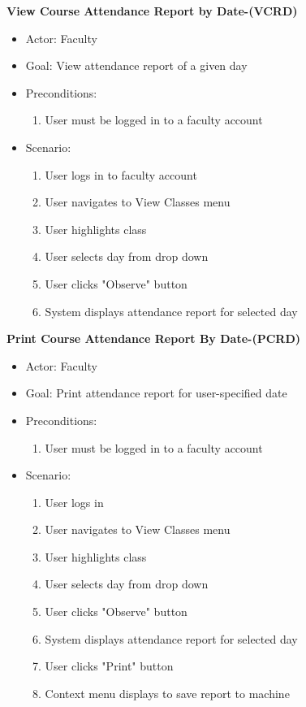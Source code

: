 \documentclass[letterpaper,12pt,oneside,listof=totoc]{scrreprt}
\begin{document}
\hfill \break
\textbf{View Course Attendance Report by Date-(VCRD)}
\begin{itemize}
    \item Actor: Faculty
    \item Goal: View attendance report of a given day
    \item Preconditions:
    \begin{enumerate}
        \item User must be logged in to a faculty account
    \end{enumerate}
    \item Scenario:
    \begin{enumerate}
        \item User logs in to faculty account
        \item User navigates to View Classes menu
        \item User highlights class
        \item User selects day from drop down
        \item User clicks "Observe" button
        \item System displays attendance report for selected day
    \end{enumerate}
\end{itemize}

\hfill \break
\textbf{Print Course Attendance Report By Date-(PCRD)}
\begin{itemize}
    \item Actor: Faculty
    \item Goal: Print attendance report for user-specified date
    \item Preconditions:
    \begin{enumerate}
        \item User must be logged in to a faculty account
    \end{enumerate}
    \item Scenario:
    \begin{enumerate}
        \item User logs in
        \item User navigates to View Classes menu
        \item User highlights class
        \item User selects day from drop down
        \item User clicks "Observe" button
        \item System displays attendance report for selected day
        \item User clicks "Print" button
        \item Context menu displays to save report to machine
    \end{enumerate}
\end{itemize}
\end{document}
